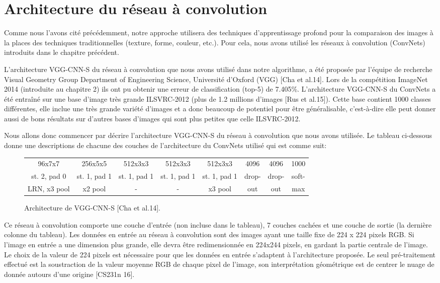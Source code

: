 \section{Architecture du réseau à convolution}
	Comme nous l'avons cité précédemment, notre approche utilisera des techniques d'apprentissage profond pour la comparaison des images à la places des techniques traditionnelles (texture, forme, couleur, etc.). Pour cela, nous avons utilisé les réseaux à convolution (ConvNets) introduits dans le chapitre précédent.
	
	L'architecture VGG-CNN-S du réseau à convolution que nous avons utilisé dans notre algorithme, a été proposée par l'équipe de recherche Visual Geometry Group Department of Engineering Science, Université d'Oxford (VGG) [Cha et al.14]. Lors de la compétition ImageNet 2014 (introduite au chapitre 2) ils ont pu obtenir une erreur de classification (top-5) de 7.405\%. L'architecture VGG-CNN-S du ConvNets a été entraîné sur une base d'image très grande ILSVRC-2012 (plus de 1.2 millions d'images [Rus et al.15]). Cette base contient 1000 classes différentes, elle inclue une très grande variété d'images et a donc beaucoup de potentiel pour être généralisable, c’est-à-dire elle peut donner aussi de bons résultats sur d'autres bases d'images qui sont plus petites que celle ILSVRC-2012.
	
	Nous allons donc commencer par décrire l'architecture VGG-CNN-S du réseau à convolution que nous avons utilisée. Le tableau ci-dessous donne une descriptions de chacune des couches de l'architecture du ConvNets utilisé qui est comme suit:

\begin{figure}[H]
\begin{center}
\begin{tabular}{|c|c|c|c|c|c|c|c|}
  \hline
96x7x7 & 256x5x5 & 512x3x3 & 512x3x3 & 512x3x3 & 4096 & 4096 & 1000\\
st. 2, pad 0 & st. 1, pad 1 & st. 1, pad 1 & st. 1, pad 1 & st. 1, pad 1 & drop- & drop- & soft-\\
LRN, x3 pool & x2 pool & - & - & x3 pool & out & out & max\\
  \hline
\end{tabular}
\end{center}
\caption{Architecture de VGG-CNN-S [Cha et al.14].}
\end{figure}
	Ce réseau à convolution comporte une couche d'entrée (non incluse dans le tableau), 7 couches cachées et une couche de sortie (la dernière colonne du tableau). Les données en entrée au réseau à convolution sont des images ayant une taille fixe de 224 x 224 pixels RGB. Si l'image en entrée a une dimension plus grande, elle devra être redimensionnée en 224x244 pixels, en gardant la partie centrale de l'image. Le choix de la valeur de 224 pixels est nécessaire pour que les données en entrée s'adaptent à l'architecture proposée. Le seul pré-traitement effectué est la soustraction de la valeur moyenne RGB de chaque pixel de l'image, son interprétation géométrique est de centrer le nuage de donnée autours d'une origine [CS231n 16].

